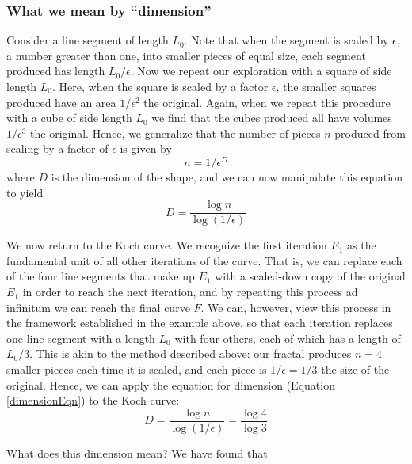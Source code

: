 \subsubsection{What we mean by ``dimension''}
Consider a line segment of length $ L_0 $. Note that when the segment is scaled by $\epsilon$, a number greater than one, into smaller pieces of equal size, each segment produced has length $L_0/\epsilon$. Now we repeat our exploration with a square of side length $ L_0 $. Here, when the square is scaled by a factor $\epsilon$, the smaller squares produced have an area $1/\epsilon^2$ the original. Again, when we repeat this procedure with a cube of side length $ L_0 $ we find that the cubes produced all have volumes $1/\epsilon^3$ the original. Hence, we generalize that the number of pieces $n$ produced from scaling by a factor of $\epsilon$ is given by 
\begin{equation}n = 1/\epsilon^D\end{equation}
where $D$ is the dimension of the shape, and we can now manipulate this equation to yield
\begin{equation}\label{dimensionEqn} D = \frac{\log{n}}{\log{(1/\epsilon)}}\end{equation}

We now return to the Koch curve. We recognize the first iteration $E_1$ as the fundamental unit of all other iterations of the curve. That is, we can replace each of the four line segments that make up $E_1$ with a scaled-down copy of the original $E_1$ in order to reach the next iteration, and by repeating this process ad infinitum we can reach the final curve $F$. We can, however, view this process in the framework established in the example above, so that each iteration replaces one line segment with a length $L_0$ with four others, each of which has a length of $L_0/3$. This is akin to the method described above: our fractal produces $n = 4$ smaller pieces each time it is scaled, and each piece is $1/\epsilon = 1/3$ the size of the original. Hence, we can apply the equation for dimension (Equation \ref{dimensionEqn}) to the Koch curve:
\begin{equation}D = \frac{\log{n}}{\log{(1/\epsilon)}} = \frac{\log{4}}{\log{3}} \end{equation}

What does this dimension mean? We have found that 








